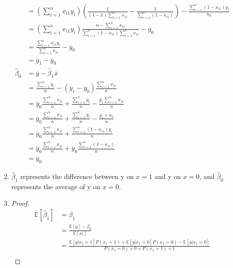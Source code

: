 \documentclass{article}
\begin{document}
\begin{enumerate}
\begin{enumerate}
\begin{equation}
\begin{aligned}
                &=\left(\sum_{i=1}^{n}x_{i1}y_i\right)\left(\frac{1}{(1-\overline{x})\sum_{i=1}^{n}x_{1i}}-\frac{1}{\sum_{i=1}^{n}(1-x_{i1})}\right)-\frac{\sum_{i=1}^{n}(1-x_{i1})y_i}{n_0} \\
                &=\left(\sum_{i=1}^{n}x_{i1}y_i\right)\frac{n-\sum_{i=1}^{n}x_{1i}}{\sum_{i=1}^{n}(1-x_{1i})\sum_{i=1}^{n}x_{1i}}-\overline{y}_0 \\
                &=\frac{\sum_{i=1}^{n}x_{i1}y_i}{\sum_{i=1}^{n}x_{1i}}-\overline{y}_0 \\
                &=\overline{y}_1-\overline{y}_0 \\
                \hat{\beta}_0
                &=\overline{y}-\hat{\beta}_1\overline{x} \\
                &=\frac{\sum_{i=1}^{n}y_i}{n}-(\overline{y}_1-\overline{y}_0)\frac{\sum_{i=1}^{n}x_{1i}}{n} \\
                &=\overline{y}_0\frac{\sum_{i=1}^{n}x_{1i}}{n}+\frac{\sum_{i=1}^{n}y_i}{n}-\frac{\overline{y}_1\sum_{i=1}^{n}x_{1i}}{n} \\
                &=\overline{y}_0\frac{\sum_{i=1}^{n}x_{1i}}{n}+\frac{\sum_{i=1}^{n}y_i}{n}-\frac{\overline{y}_1\times n_1}{n} \\
                &=\overline{y}_0\frac{\sum_{i=1}^{n}x_{1i}}{n}+\frac{\sum_{i=1}^{n}(1-x_{i1})y_i}{n} \\
                &=\overline{y}_0\frac{\sum_{i=1}^{n}x_{1i}}{n}+\overline{y}_0\frac{\sum_{i=1}^{n}(1-x_{1i})}{n} \\
                &=\overline{y}_0
            \end{aligned}
            \nonumber
        \end{equation}
        \item $\hat{\beta}_1$ represents the difference between y on $x=1$ and y on $x=0$, and $\hat{\beta}_0$ represents the average of y on $x=0$.
        \item \begin{proof}
            \begin{equation}
                \begin{aligned}
                    \mathbb{E}[\hat{\beta}_1]
                    &=\beta_1 \\
                    &=\frac{\mathbb{E}[y]-\beta_0}{\mathbb{E}[x_1]} \\
                    &=\frac{\mathbb{E}[y|x_1=1]P(x_1=1)+\mathbb{E}[y|x_1=0]P(x_1=0)-\mathbb{E}[y|x_1=0]}{P(x_1=0)\times0+P(x_1=1)\times1} \\

\end{aligned}
\end{equation}
\end{proof}
\end{enumerate}
\end{enumerate}
\end{document}
